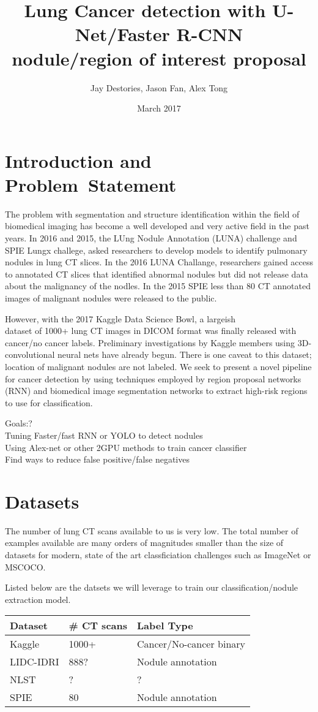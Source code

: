 \documentclass[twocolumn,10pt]{article}
\title{Lung Cancer detection with U-Net/Faster R-CNN \\
nodule/region of interest proposal}
\author{Jay Destories, Jason Fan, Alex Tong}
\date{March 2017}
\newcommand{\temp}[1]{{\color{red}#1\\}}
\begin{document}
\maketitle
\section{Introduction and \\Problem~Statement}
The problem with segmentation and structure identification within the field of 
biomedical imaging has become a well developed and very active field in the past
years. In 2016 and 2015, the LUng Nodule Annotation (LUNA) challenge and 
SPIE Lungx challege, asked researchers to develop models to identify pulmonary 
nodules in lung CT slices. In the 2016 LUNA Challange, researchers gained access
to annotated CT slices that identified abnormal nodules but did not release data
about the malignancy of the nodles. In the 2015 SPIE less than 80 CT annotated 
images of malignant nodules were released to the public.

However, with the 2017 Kaggle Data Science Bowl, a large\temp{ish} dataset of
1000+ lung CT images in DICOM format was finally released with cancer/no cancer 
labels. Preliminary investigations by Kaggle members
using 3D-convolutional neural nets have already begun. There is one caveat to this 
dataset; location of malignant nodules are not labeled. We seek to present a 
novel pipeline for cancer detection by using techniques employed by region 
proposal networks (RNN) and 
biomedical image segmentation networks to extract high-risk regions to use for
classification.

\temp{Goals:?}
\temp{Tuning Faster/fast RNN or YOLO to detect nodules}
\temp{Using Alex-net or other 2GPU methods to train cancer classifier}
\temp{Find ways to reduce false positive/false negatives}

\section{Datasets}
The number of lung CT scans available to us is very low. The total number of examples
available are many orders of magnitudes smaller than the size of datasets for modern,
state of the art classficiation challenges such as ImageNet or MSCOCO. 

Listed below are the datsets we will leverage to train our classification/nodule
extraction model.

\begin{center}
\begin{tabular}{lll}
  \toprule
  Dataset & \# CT scans & Label Type\\
  \midrule
  Kaggle&1000+&Cancer/No-cancer binary\\
  LIDC-IDRI&888?&Nodule annotation\\
  NLST&?&?\\
  SPIE&80&Nodule annotation\\
\end{tabular}
\end{center}
\end{document}
